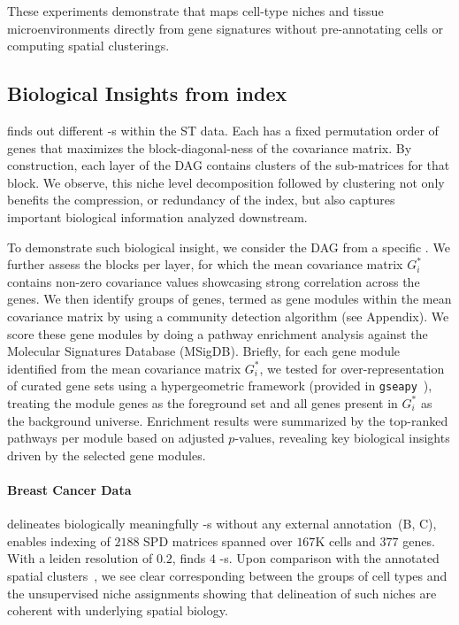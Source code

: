\documentclass[pdflatex,sn-mathphys-num]{sn-jnl}%
\theoremstyle{thmstyleone}%
\theoremstyle{thmstyletwo}%
\theoremstyle{thmstylethree}%
\begin{document}
These experiments demonstrate that \OurMethod{} maps cell-type niches and tissue microenvironments directly from gene signatures without pre-annotating cells or computing spatial clusterings.



\subsection{Biological Insights from \OurMethod index}
\OurMethod finds out different \spdniche-s within  the ST data. Each \spdniche has a fixed permutation order of genes that maximizes the block-diagonal-ness of the covariance matrix. By construction, each layer of the DAG contains clusters of the sub-matrices for that block. We observe, this niche level decomposition followed by clustering not only benefits the compression, or redundancy of the index, but also captures important biological information analyzed downstream. 

To demonstrate such biological insight, we consider the DAG from a specific \spdniche. We further assess the blocks per layer, for which the mean covariance matrix $G^{\ast}_i$ contains non-zero covariance values showcasing strong correlation across the genes. We then identify groups of genes, termed as gene modules within the mean covariance matrix by using a community detection algorithm (see Appendix). We score these gene modules by doing a pathway enrichment analysis against the Molecular Signatures Database (MSigDB). Briefly, for each gene module identified from the mean covariance matrix $G_i^{\ast}$, we tested for over-representation of curated gene sets using a hypergeometric framework (provided in \texttt{gseapy}~\cite{gseapy}), treating the module genes as the foreground set and all genes present in $G_i^{\ast}$ as the background universe. Enrichment results were summarized by the top-ranked pathways per module based on adjusted $p$-values, revealing key biological insights driven by the selected gene modules.

\paragraph{\textbf{Breast Cancer Data}} \OurMethod delineates biologically meaningfully \spdniche-s without any external annotation~(B, C), enables indexing of $2188$ SPD matrices spanned over $167$K cells and $377$ genes. With a leiden resolution of $0.2$, \OurMethod finds $4$ \spdniche-s. Upon comparison with the annotated spatial clusters~\cite{breast}, we see clear corresponding between the groups of cell types and the unsupervised niche assignments showing that delineation of such niches are coherent with underlying spatial biology. 
\end{document}
